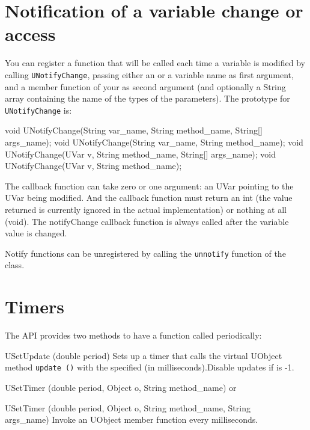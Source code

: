 \section{Notification of a variable change or access}
\label{sec:uob:apijava:uvar-notify}

You can register a function that will be called each time a variable is
modified by calling \lstinline{UNotifyChange}, passing either an \UVar or a
variable name as first argument, and a member function of your \UObject as
second argument (and optionally a String array containing the name of the
types of the parameters). The prototype for \lstinline{UNotifyChange} is:

\begin{java}
void UNotifyChange(String var_name, String method_name, String[] args_name);
void UNotifyChange(String var_name, String method_name);
void UNotifyChange(UVar v, String method_name, String[] args_name);
void UNotifyChange(UVar v, String method_name);
\end{java}

The callback function can take zero or one argument: an UVar pointing to the
UVar being modified. And the callback function must return an int (the value
returned is currently ignored in the actual implementation) or nothing at
all (void).  The notifyChange callback function is always called after the
variable value is changed.

Notify functions can be unregistered by calling the \lstinline{unnotify}
function of the \UVar class.

\section{Timers}
\label{sec:uob:apijava:timers}
The API provides two methods to have a function called periodically:
\begin{cxxapi}
\item[USetUpdate (double period)] Sets up a timer that calls the virtual
  UObject method \lstinline{update ()} with the specified  (in
  milliseconds).Disable updates if  is -1.
\item[USetTimer (double period, Object o, String method\_name)] or
\item[USetTimer (double period, Object o, String method\_name, String\[\]
  args\_name)] Invoke an UObject member function  every
   milliseconds.
\end{cxxapi}



